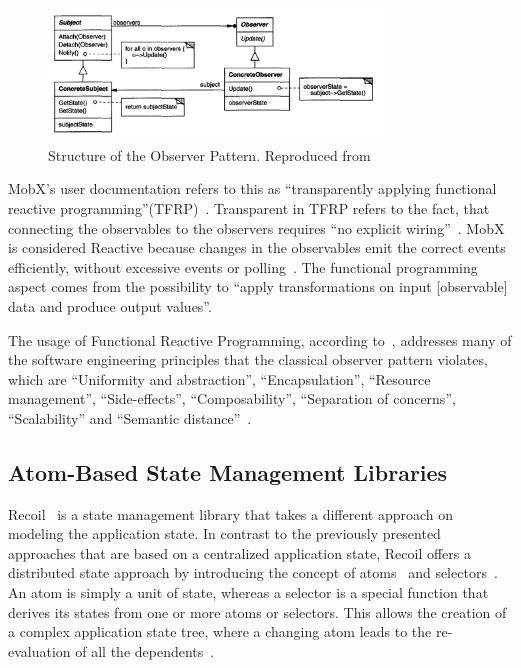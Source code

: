 \begin{figure}
\centering
\includegraphics[width=0.8\textwidth]{images/Untitled_11.png}
\caption{Structure of the Observer Pattern. Reproduced from~\cite{gang_of_four}}
\label{image_class_diagram_observer_gof}
\end{figure}


MobX's user documentation refers to this as ``transparently applying
functional reactive
programming''(TFRP)~\cite{mobx}.
Transparent in TFRP refers to the fact, that connecting the observables
to the observers requires ``no explicit wiring''~\cite{tfrp_explanaition}. MobX is considered Reactive because changes in the
observables emit the correct events efficiently, without excessive
events or polling~\cite{tfrp_explanaition}. The functional programming aspect comes from the
possibility to ``apply transformations on input [observable] data and produce output values''\cite{tfrp_explanaition}.

The usage of Functional Reactive Programming, according to~\cite{deprecating_the_observer_pattern},
addresses many of the software engineering principles that the classical
observer pattern violates, which are ``Uniformity and
abstraction'', ``Encapsulation'', ``Resource management'', ``Side-effects'',
``Composability'', ``Separation of concerns'', ``Scalability'' and ``Semantic
distance''~\cite{deprecating_the_observer_pattern}.

\clearpage
\clearpage
\hypertarget{atomic-state-management-libraries}{%
\subsection{Atom-Based State Management
Libraries}\label{atomic-state-management-libraries}}

Recoil~\cite{recoil} is a state management library that takes a different approach on
modeling the application state. In contrast to the previously presented
approaches that are based on a centralized application state, Recoil
offers a distributed state approach by introducing the concept of atoms~\cite{recoil_atoms}
and selectors~\cite{recoil_selectors}. An atom is simply a unit of state, whereas a
selector is a special function that derives its states from one or more
atoms or selectors. This allows the creation of a complex
application state tree, where a changing atom leads to the
re-evaluation of all the dependents~\cite{recoil_core_concepts}.

